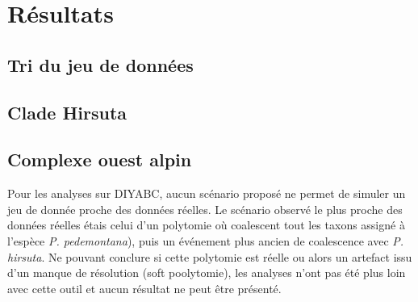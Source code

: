 \section{Résultats}

\subsection{Tri du jeu de données}


\subsection{Clade Hirsuta}




\subsection{Complexe ouest alpin}

Pour les analyses sur DIYABC, aucun scénario proposé ne permet de simuler un jeu de donnée proche des données réelles. 
Le scénario observé le plus proche des données réelles étais celui d'un polytomie où coalescent tout les taxons assigné à l'espèce \textit{P. pedemontana}), puis un événement plus ancien de coalescence avec \textit{P. hirsuta}.
Ne pouvant conclure si cette polytomie est réelle ou alors un artefact issu d'un manque de résolution (soft poolytomie), les analyses n'ont pas été plus loin avec cette outil et aucun résultat ne peut être présenté.

